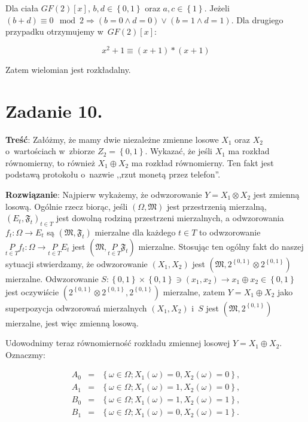 \documentclass[a4paper,10pt, twocolumn]{article}
\begin{document}
Dla ciała $GF(2)[x]$, $b, d \in \left\{0, 1\right\}$ oraz $a, c \in \left\{1\right\}$. Jeżeli $(b + d) \equiv 0 \mod 2 \Rightarrow (b = 0 \wedge d = 0) \vee (b = 1 \wedge d = 1)$. Dla drugiego przypadku otrzymujemy w~$GF(2)[x]$:

\begin{equation*}
	x^{2} + 1 \equiv (x+1) * (x+1)
\end{equation*}

Zatem wielomian jest rozkładalny.

\section{Zadanie 10.}

\textbf{Treść}: Załóżmy, że mamy dwie niezależne zmienne losowe $X_{1}$ oraz $X_{2}$ o~wartościach w~zbiorze $Z_{2} = \left\{0, 1\right\}$. Wykazać, że jeśli $X_{1}$ ma rozkład równomierny, to również $X_{1} \oplus X_{2}$ ma rozkład równomierny. Ten fakt jest podstawą protokołu o~nazwie ,,rzut monetą przez telefon''.

\textbf{Rozwiązanie}: Najpierw wykażemy, że odwzorowanie $Y = X_{1} \otimes X_{2}$ jest zmienną losową. Ogólnie rzecz biorąc, jeśli $(\Omega, \mathfrak{M})$ jest przestrzenią mierzalną, $(E_{t}, \mathfrak{F}_{t})_{t \in T}$ jest dowolną rodziną przestrzeni mierzalnych, a odwzorowania $f_{t}: \Omega \rightarrow E_{t}$ są $(\mathfrak{M}, \mathfrak{F}_{t})$ mierzalne dla każdego $t \in T$ to odwzorowanie $\underset{t \in T}{P} f_{t}: \Omega \rightarrow \underset{t \in T}{P} E_{t}$ jest $(\mathfrak{M}, \underset{t \in T}{P} \mathfrak{F}_{t})$ mierzalne. Stosując ten ogólny fakt do naszej sytuacji stwierdzamy, że odwzorowanie $(X_{1}, X_{2})$ jest $(\mathfrak{M}, 2^{\left\{0,1\right\}} \otimes  2^{\left\{0,1\right\}})$ mierzalne. Odwzorowanie $S: \left\{0,1\right\} \times \left\{0,1\right\} \ni (x_{1}, x_{2}) \rightarrow x_{1} \oplus x_{2} \in \left\{0,1\right\}$ jest oczywiście $(2^{\left\{0,1\right\}} \otimes  2^{\left\{0,1\right\}},  2^{\left\{0,1\right\}})$ mierzalne, zatem $Y = X_{1} \oplus X_{2}$ jako superpozycja odwzorowań mierzalnych $(X_{1}, X_{2})$ i~$S$ jest $(\mathfrak{M},  2^{\left\{0,1\right\}})$ mierzalne, jest więc zmienną losową.

Udowodnimy teraz równomierność rozkładu zmiennej losowej $Y = X_{1} \oplus X_{2}$. Oznaczmy: 

\begin{equation*}
	\begin{array}{lcl} A_{0} & = & \left\{\omega \in \Omega; X_{1}(\omega) = 0, X_{2}(\omega) = 0 \right\}, \\ A_{1} & = & \left\{\omega \in \Omega; X_{1}(\omega) = 1, X_{2}(\omega) = 0 \right\}, \\ B_{0} & = & \left\{\omega \in \Omega; X_{1}(\omega) = 1, X_{2}(\omega) = 1 \right\}, \\ B_{1} & = & \left\{\omega \in \Omega; X_{1}(\omega) = 0, X_{2}(\omega) = 1 \right\}. \\\end{array}
\end{equation*}
\end{document}
